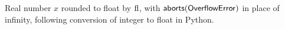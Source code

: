 Real number $x$ rounded to float by $\mathrm{fl}$, with $\mathsf{aborts}(\mathsf{OverflowError})$ in place of infinity, following conversion of integer to float in Python.
